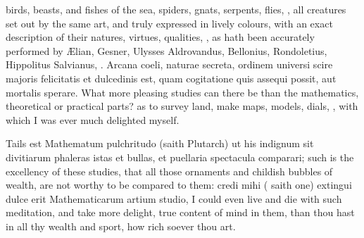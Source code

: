 {birds, beasts, and fishes of the sea, spiders, gnats, serpents, flies,
\etc{}, all creatures set out by the same art, and truly expressed in
lively colours, with an exact description of their natures, virtues,
qualities, \etc{}, as hath been accurately performed by \AE{}lian, Gesner,
Ulysses Aldrovandus, Bellonius, Rondoletius, Hippolitus Salvianus, \etc{}.
Arcana coeli, naturae secreta, ordinem universi scire majoris
felicitatis et dulcedinis est, quam cogitatione quis assequi possit,
aut mortalis sperare. What more pleasing studies can there be than the
mathematics, theoretical or practical parts? as to survey land, make
maps, models, dials, \etc{}, with which I was ever much delighted myself.

Tails est Mathematum pulchritudo (saith  Plutarch) ut his
indignum sit divitiarum phaleras istas et bullas, et puellaria
spectacula comparari; such is the excellency of these studies, that all
those ornaments and childish bubbles of wealth, are not worthy to be
compared to them: credi mihi ( saith one) extingui dulce erit
Mathematicarum artium studio, I could even live and die with such
meditation, and take more delight, true content of mind in them,
than thou hast in all thy wealth and sport, how rich soever thou art.

}
